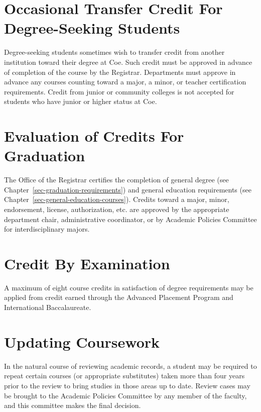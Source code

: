 \documentclass[
  letterpaper,
]{scrbook}
\begin{document}
\section{Occasional Transfer Credit For Degree-Seeking
Students}\label{occasional-transfer-credit-for-degree-seeking-students}

Degree-seeking students sometimes wish to transfer credit from another
institution toward their degree at Coe. Such credit must be approved in
advance of completion of the course by the Registrar. Departments must
approve in advance any courses counting toward a major, a minor, or
teacher certification requirements. Credit from junior or community
colleges is not accepted for students who have junior or higher status
at Coe.

\section{Evaluation of Credits For
Graduation}\label{evaluation-of-credits-for-graduation}

The Office of the Registrar certifies the completion of general degree
(see Chapter~\ref{sec-graduation-requirements}) and general education
requirements (see Chapter~\ref{sec-general-education-courses}). Credits
toward a major, minor, endorsement, license, authorization, etc. are
approved by the appropriate department chair, administrative
coordinator, or by Academic Policies Committee for interdisciplinary
majors.

\section{Credit By Examination}\label{credit-by-examination}

A maximum of eight course credits in satisfaction of degree requirements
may be applied from credit earned through the Advanced Placement Program
and International Baccalaureate.

\section{Updating Coursework}\label{updating-coursework}

In the natural course of reviewing academic records, a student may be
required to repeat certain courses (or appropriate substitutes) taken
more than four years prior to the review to bring studies in those areas
up to date. Review cases may be brought to the Academic Policies
Committee by any member of the faculty, and this committee makes the
final decision.
\end{document}
